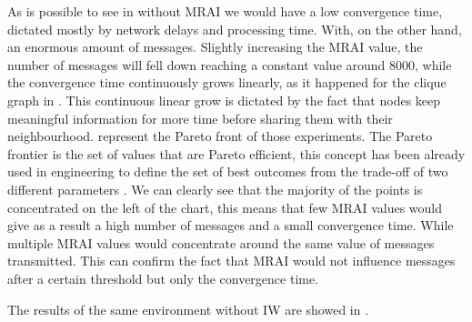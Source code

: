 As is possible to see in 
without \ac{MRAI} we would have a low convergence time, dictated mostly by
network delays and processing time. With, on the other hand, an enormous amount
of messages.
Slightly increasing the \ac{MRAI} value, the number of messages will fell down
reaching a constant value around \num{8000}, while the convergence time
continuously grows linearly, as it happened for the clique graph in .
This continuous linear grow is dictated by the fact that nodes keep meaningful
information for more time before sharing them with their neighbourhood.
 represent the Pareto
front of those experiments.
The Pareto frontier is the set of values that are Pareto efficient, this concept
has been already used in engineering to define the set of best outcomes from
the trade-off of two different parameters \cite{goodarzi2014introduction}.
We can clearly see that the majority of the points is concentrated on the left
of the chart, this means that few \ac{MRAI} values would give as a result
a high number of messages and a small convergence time.
While multiple \ac{MRAI} values would concentrate around the same value of
messages transmitted.
This can confirm the fact that \ac{MRAI} would not influence messages
after a certain threshold but only the convergence time.

The results of the same environment without \ac{IW} are showed in
.

